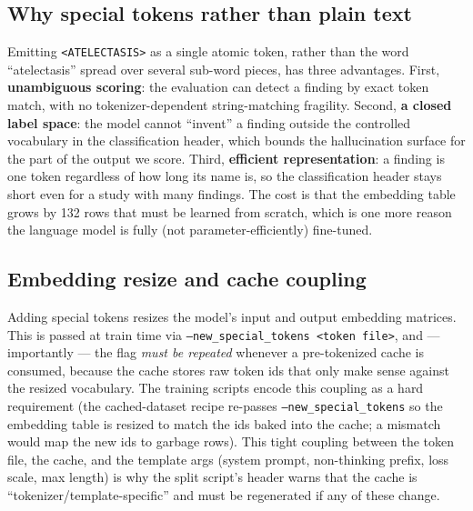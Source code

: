 \documentclass[11pt,a4paper]{article}
\begin{document}
\subsection{Why special tokens rather than plain text}
Emitting \texttt{<ATELECTASIS>} as a single atomic token, rather than the word ``atelectasis'' spread over several sub-word pieces, has three advantages. First, \textbf{unambiguous scoring}: the evaluation can detect a finding by exact token match, with no tokenizer-dependent string-matching fragility. Second, \textbf{a closed label space}: the model cannot ``invent'' a finding outside the controlled vocabulary in the classification header, which bounds the hallucination surface for the part of the output we score. Third, \textbf{efficient representation}: a finding is one token regardless of how long its name is, so the classification header stays short even for a study with many findings. The cost is that the embedding table grows by 132 rows that must be learned from scratch, which is one more reason the language model is fully (not parameter-efficiently) fine-tuned.

\subsection{Embedding resize and cache coupling}
Adding special tokens resizes the model's input and output embedding matrices. This is passed at train time via \texttt{--new\_special\_tokens <token file>}, and --- importantly --- the flag \emph{must be repeated} whenever a pre-tokenized cache is consumed, because the cache stores raw token ids that only make sense against the resized vocabulary. The training scripts encode this coupling as a hard requirement (the cached-dataset recipe re-passes \texttt{--new\_special\_tokens} so the embedding table is resized to match the ids baked into the cache; a mismatch would map the new ids to garbage rows). This tight coupling between the token file, the cache, and the template args (system prompt, non-thinking prefix, loss scale, max length) is why the split script's header warns that the cache is ``tokenizer/template-specific'' and must be regenerated if any of these change.
\end{document}
